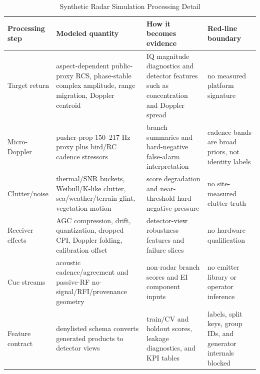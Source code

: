 \begin{table}[t]
  \caption{Synthetic Radar Simulation Processing Detail}
  \label{tab:radarsimprocessing}
  \centering
  \small
  \begin{tabular}{@{}p{}p{}p{}p{}@{}}
    \toprule
    Processing step & Modeled quantity & How it becomes evidence & Red-line boundary \\
    \midrule
    Target return & aspect-dependent public-proxy RCS, phase-stable complex amplitude, range migration, Doppler centroid & IQ magnitude diagnostics and detector features such as concentration and Doppler spread & no measured platform signature \\
    Micro-Doppler & pusher-prop 150--217 Hz proxy plus bird/RC cadence stressors & branch summaries and hard-negative false-alarm interpretation & cadence bands are broad priors, not identity labels \\
    Clutter/noise & thermal/SNR buckets, Weibull/K-like clutter, sea/weather/terrain glint, vegetation motion & score degradation and near-threshold hard-negative pressure & no site-measured clutter truth \\
    Receiver effects & AGC compression, drift, quantization, dropped CPI, Doppler folding, calibration offset & detector-view robustness features and failure slices & no hardware qualification \\
    Cue streams & acoustic cadence/agreement and passive-RF no-signal/RFI/provenance geometry & non-radar branch scores and EI component inputs & no emitter library or operator inference \\
    Feature contract & denylisted schema converts generated products to detector views & train/CV and holdout scores, leakage diagnostics, and KPI tables & labels, split keys, group IDs, and generator internals blocked \\
    \bottomrule
  \end{tabular}
\end{table}

